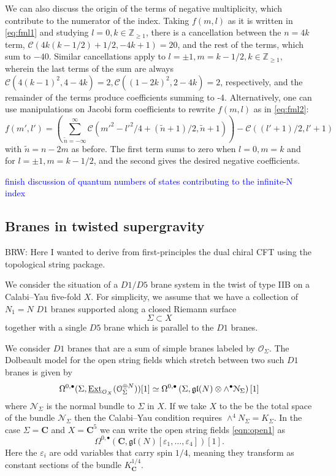\documentclass[11pt]{amsart}
\newcommand{\mc}{\mathcal}
\newcommand{\cN}{\mathcal{N}}
\def\ep{\varepsilon}
\def\bu{{\bullet}}
\def\cO{\mc O}
\def\lie#1{\ensuremath{\mathfrak{#1}}}
\newcommand\C{\mathbf{C}}
\def\brian#1{{\textcolor{blue!65!red}{BRW: {#1}}}}
\newcommand\beqn{\begin{equation}}
\newcommand\eeqn{\end{equation}}
\theoremstyle{thm}
\numberwithin{equation}{subsection}
\theoremstyle{def}
\theoremstyle{rem}
\begin{document}
We can also discuss the origin of the terms of negative multiplicity, which contribute to the numerator of the index. Taking $f(m,l)$ as it is written in \ref{eq:fml1} and studying $l=0, k \in \mathbb{Z}_{\geq 1}$, there is a cancellation between the $n=4k$ term, $\mathcal{C}(4k(k-1/2) + 1/2,-4k+1)=20$, and the rest of the terms, which sum to $-40$. Similar cancellations apply to $l=\pm 1, m = k-1/2, k \in \mathbb{Z}_{\geq 1}$, wherein the last terms of the sum are always $\mathcal{C}(4(k-1)^2, 4-4k) = 2, \mathcal{C}((1-2k)^2, 2-4k) = 2$, respectively, and the remainder of the terms produce coefficients summing to -4. Alternatively, one can use manipulations on Jacobi form coefficients to rewrite $f(m, l)$ as in \ref{eq:fml2}:
\begin{equation}
f(m', l') =\left(\sum_{\tilde{n}= - \infty}^{\infty}\mathcal{C}(m'^2 - l'^2/4 + (\tilde{n} + 1)/2, \tilde{n} + 1) \right) - \mathcal{C}((l' + 1)/2, l' + 1)
\end{equation} with $\tilde{n} = n-2m$ as before. The first term sums to zero when $l=0, m= k$ and for $l=\pm 1, m = k-1/2$, and the second gives the desired negative coefficients.


\textcolor{blue}{finish discussion of quantum numbers of states contributing to the infinite-N index}

\subsection{Branes in twisted supergravity}
\brian{Here I wanted to derive from first-principles the dual chiral CFT using the topological string package.}

We consider the situation of a $D1/D5$ brane system in the twist of type IIB on a Calabi--Yau five-fold $X$. 
For simplicity, we assume that we have a collection of $N_1 = N$ $D1$ branes supported along a closed Riemann surface
\[
\Sigma \subset X 
\]
together with a single $D5$ brane which is parallel to the $D1$ branes. 

We consider $D1$ branes that are a sum of simple branes labeled by $\cO_\Sigma$.
The Dolbeault model for the open string fields which stretch between two such $D1$ branes is given by 
\beqn\label{eqn:open1}
\Omega^{0,\bu}(\Sigma, \underline{\rm Ext}_{\cO_X}(\cO_\Sigma^{\oplus N}))[1] \simeq \Omega^{0,\bu}\left(\Sigma, \lie{gl}(N) \otimes \wedge^\bu \cN_\Sigma\right) [1] 
\eeqn
where $\cN_\Sigma$ is the normal bundle to $\Sigma$ in $X$.
If we take $X$ to the be the total space of the bundle $\cN_\Sigma$ then the Calabi--Yau condition requires $\wedge^4 N_\Sigma = K_\Sigma$. 
In the case $\Sigma = \C$ and $X = \C^5$ 
we can write the open string fields \eqref{eqn:open1} as 
\beqn\label{eqn:open1a}
\Omega^{0,\bu}\left(\C , \lie{gl}(N) [\ep_1,\ldots,\ep_4] \right) [1] .
\eeqn
Here the $\ep_i$ are odd variables that carry spin $1/4$, meaning they transform as constant sections of the bundle $K_\C^{1/4}$.
\end{document}
